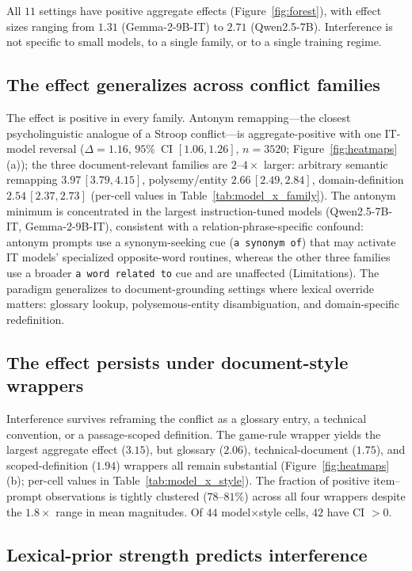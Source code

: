 \documentclass[11pt]{article}
\newcommand{\effect}{\ensuremath{\Delta}\xspace}
\begin{document}
All $11$ settings have positive aggregate effects (Figure~\ref{fig:forest}), with effect sizes
ranging from $1.31$ (Gemma-2-9B-IT) to $2.71$ (Qwen2.5-7B). Interference is not specific to
small models, to a single family, or to a single training regime.

\subsection{The effect generalizes across conflict families}

The effect is positive in every family. Antonym remapping---the closest psycholinguistic
analogue of a Stroop conflict---is aggregate-positive with one IT-model reversal
($\effect = 1.16$, $95\%$~CI $[1.06, 1.26]$, $n{=}3520$; Figure~\ref{fig:heatmaps}(a)); the
three document-relevant families are $2$--$4\times$ larger: arbitrary semantic remapping
$3.97$\,$[3.79, 4.15]$, polysemy/entity $2.66$\,$[2.49, 2.84]$, domain-definition
$2.54$\,$[2.37, 2.73]$ (per-cell values in Table~\ref{tab:model_x_family}). The antonym
minimum is concentrated in the largest instruction-tuned models (Qwen2.5-7B-IT, Gemma-2-9B-IT),
consistent with a relation-phrase-specific confound: antonym prompts use a synonym-seeking cue
(\texttt{a synonym of}) that may activate IT models' specialized opposite-word routines,
whereas the other three families use a broader \texttt{a word related to} cue and are
unaffected (Limitations). The paradigm generalizes to document-grounding settings where lexical override matters:
glossary lookup, polysemous-entity disambiguation, and domain-specific redefinition.

\subsection{The effect persists under document-style wrappers}

Interference survives reframing the conflict as a glossary entry, a technical convention, or a
passage-scoped definition. The game-rule wrapper yields the largest aggregate effect ($3.15$),
but glossary ($2.06$), technical-document ($1.75$), and scoped-definition ($1.94$) wrappers all
remain substantial (Figure~\ref{fig:heatmaps}(b); per-cell values in
Table~\ref{tab:model_x_style}). The fraction of positive item--prompt observations is tightly clustered ($78$--$81\%$) across
all four wrappers despite the $1.8\times$ range in mean magnitudes. Of $44$
model$\times$style cells, $42$ have CI $> 0$.

\subsection{Lexical-prior strength predicts interference}
\label{sec:lexical_predictor}
\end{document}
